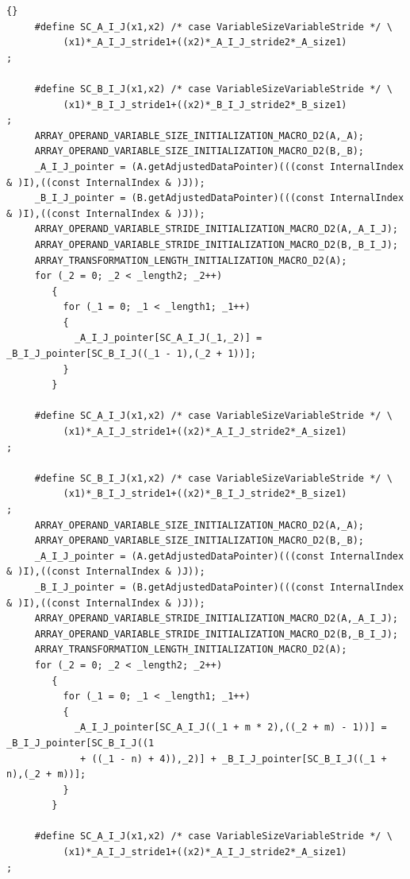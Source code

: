 \documentclass[10pt]{article}
\begin{document}
{\begin{lstlisting}{}
     #define SC_A_I_J(x1,x2) /* case VariableSizeVariableStride */ \
          (x1)*_A_I_J_stride1+((x2)*_A_I_J_stride2*_A_size1)
; 
        
     #define SC_B_I_J(x1,x2) /* case VariableSizeVariableStride */ \
          (x1)*_B_I_J_stride1+((x2)*_B_I_J_stride2*_B_size1)
; 
     ARRAY_OPERAND_VARIABLE_SIZE_INITIALIZATION_MACRO_D2(A,_A); 
     ARRAY_OPERAND_VARIABLE_SIZE_INITIALIZATION_MACRO_D2(B,_B); 
     _A_I_J_pointer = (A.getAdjustedDataPointer)(((const InternalIndex & )I),((const InternalIndex & )J)); 
     _B_I_J_pointer = (B.getAdjustedDataPointer)(((const InternalIndex & )I),((const InternalIndex & )J)); 
     ARRAY_OPERAND_VARIABLE_STRIDE_INITIALIZATION_MACRO_D2(A,_A_I_J); 
     ARRAY_OPERAND_VARIABLE_STRIDE_INITIALIZATION_MACRO_D2(B,_B_I_J); 
     ARRAY_TRANSFORMATION_LENGTH_INITIALIZATION_MACRO_D2(A); 
     for (_2 = 0; _2 < _length2; _2++)
        { 
          for (_1 = 0; _1 < _length1; _1++)
          { 
            _A_I_J_pointer[SC_A_I_J(_1,_2)] = _B_I_J_pointer[SC_B_I_J((_1 - 1),(_2 + 1))]; 
          } 
        } 
        
     #define SC_A_I_J(x1,x2) /* case VariableSizeVariableStride */ \
          (x1)*_A_I_J_stride1+((x2)*_A_I_J_stride2*_A_size1)
; 
        
     #define SC_B_I_J(x1,x2) /* case VariableSizeVariableStride */ \
          (x1)*_B_I_J_stride1+((x2)*_B_I_J_stride2*_B_size1)
; 
     ARRAY_OPERAND_VARIABLE_SIZE_INITIALIZATION_MACRO_D2(A,_A); 
     ARRAY_OPERAND_VARIABLE_SIZE_INITIALIZATION_MACRO_D2(B,_B); 
     _A_I_J_pointer = (A.getAdjustedDataPointer)(((const InternalIndex & )I),((const InternalIndex & )J)); 
     _B_I_J_pointer = (B.getAdjustedDataPointer)(((const InternalIndex & )I),((const InternalIndex & )J)); 
     ARRAY_OPERAND_VARIABLE_STRIDE_INITIALIZATION_MACRO_D2(A,_A_I_J); 
     ARRAY_OPERAND_VARIABLE_STRIDE_INITIALIZATION_MACRO_D2(B,_B_I_J); 
     ARRAY_TRANSFORMATION_LENGTH_INITIALIZATION_MACRO_D2(A); 
     for (_2 = 0; _2 < _length2; _2++)
        { 
          for (_1 = 0; _1 < _length1; _1++)
          { 
            _A_I_J_pointer[SC_A_I_J((_1 + m * 2),((_2 + m) - 1))] = _B_I_J_pointer[SC_B_I_J((1
             + ((_1 - n) + 4)),_2)] + _B_I_J_pointer[SC_B_I_J((_1 + n),(_2 + m))]; 
          } 
        } 
        
     #define SC_A_I_J(x1,x2) /* case VariableSizeVariableStride */ \
          (x1)*_A_I_J_stride1+((x2)*_A_I_J_stride2*_A_size1)
; 
        

\end{lstlisting}}
\end{document}
